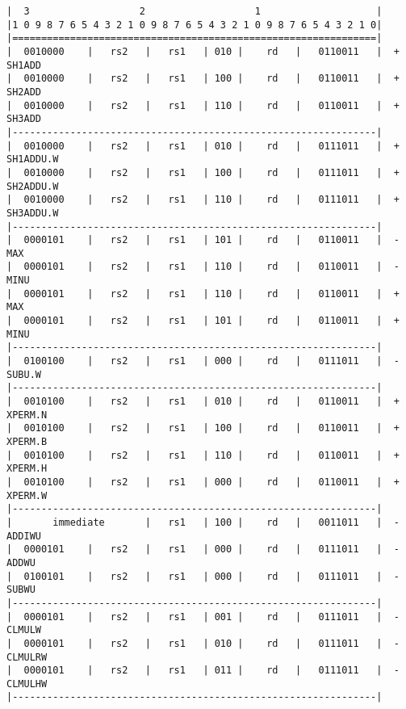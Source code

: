 \begin{minipage}{\linewidth}
\begin{verbatim}
|  3                   2                   1                    |
|1 0 9 8 7 6 5 4 3 2 1 0 9 8 7 6 5 4 3 2 1 0 9 8 7 6 5 4 3 2 1 0|
|===============================================================|
|  0010000    |   rs2   |   rs1   | 010 |    rd   |   0110011   |  + SH1ADD
|  0010000    |   rs2   |   rs1   | 100 |    rd   |   0110011   |  + SH2ADD
|  0010000    |   rs2   |   rs1   | 110 |    rd   |   0110011   |  + SH3ADD
|---------------------------------------------------------------|
|  0010000    |   rs2   |   rs1   | 010 |    rd   |   0111011   |  + SH1ADDU.W
|  0010000    |   rs2   |   rs1   | 100 |    rd   |   0111011   |  + SH2ADDU.W
|  0010000    |   rs2   |   rs1   | 110 |    rd   |   0111011   |  + SH3ADDU.W
|---------------------------------------------------------------|
|  0000101    |   rs2   |   rs1   | 101 |    rd   |   0110011   |  - MAX
|  0000101    |   rs2   |   rs1   | 110 |    rd   |   0110011   |  - MINU
|  0000101    |   rs2   |   rs1   | 110 |    rd   |   0110011   |  + MAX
|  0000101    |   rs2   |   rs1   | 101 |    rd   |   0110011   |  + MINU
|---------------------------------------------------------------|
|  0100100    |   rs2   |   rs1   | 000 |    rd   |   0111011   |  - SUBU.W
|---------------------------------------------------------------|
|  0010100    |   rs2   |   rs1   | 010 |    rd   |   0110011   |  + XPERM.N
|  0010100    |   rs2   |   rs1   | 100 |    rd   |   0110011   |  + XPERM.B
|  0010100    |   rs2   |   rs1   | 110 |    rd   |   0110011   |  + XPERM.H
|  0010100    |   rs2   |   rs1   | 000 |    rd   |   0110011   |  + XPERM.W
|---------------------------------------------------------------|
|       immediate       |   rs1   | 100 |    rd   |   0011011   |  - ADDIWU
|  0000101    |   rs2   |   rs1   | 000 |    rd   |   0111011   |  - ADDWU
|  0100101    |   rs2   |   rs1   | 000 |    rd   |   0111011   |  - SUBWU
|---------------------------------------------------------------|
|  0000101    |   rs2   |   rs1   | 001 |    rd   |   0111011   |  - CLMULW
|  0000101    |   rs2   |   rs1   | 010 |    rd   |   0111011   |  - CLMULRW
|  0000101    |   rs2   |   rs1   | 011 |    rd   |   0111011   |  - CLMULHW
|---------------------------------------------------------------|
\end{verbatim}
\end{minipage}

